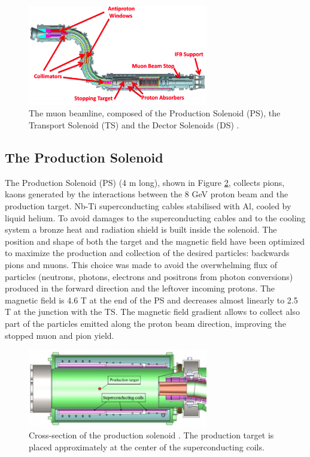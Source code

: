 \begin{figure}[!h]
\centering
\includegraphics[width =0.7\textwidth]{figures/png/Screenshot_20240303_152845.png}
\caption[The muon beamline.]{The muon beamline, composed of the Production Solenoid (PS), 
the Transport Solenoid (TS) and the Dector Solenoids (DS) \cite{ginther}. 
}
\label{fig:muonbeamline}
\end{figure}


\subsection{The Production Solenoid}
The Production Solenoid (PS) (4 m long), shown in Figure 
\ref{fig:PS}, collects pions, 
kaons generated by the interactions between the 8 GeV 
proton beam and the production target. 
 Nb-Ti
superconducting cables stabilised with Al,  
 cooled by liquid helium.
To avoid damages to the 
superconducting cables and
to the cooling system a bronze heat and radiation shield 
is built inside the solenoid. 
The position and shape of both the target and the magnetic 
field have been optimized to
maximize the production and collection of the 
desired particles: backwards pions and
muons. This choice was made to avoid the overwhelming
flux of particles (neutrons, photons, electrons and 
positrons from photon conversions) produced in the forward 
direction and the leftover incoming protons. 
The magnetic field is 4.6 T at the end of the PS and 
decreases almost linearly to 2.5 T at the
junction with the TS.
The magnetic field gradient allows to collect also part of the particles 
emitted along the proton beam direction, improving 
the stopped muon and pion yield.


\begin{figure}[!h]
    \centering
    \includegraphics[width =0.7\textwidth]{figures/png/800px-Production_solenoid.png}
    \caption[The cross-section of the production solenoid.]{Cross-section of the production solenoid \cite{6376120}.
    The production target is placed approximately at the center of the superconducting coils.}
    \label{fig:PS}
    \end{figure}
